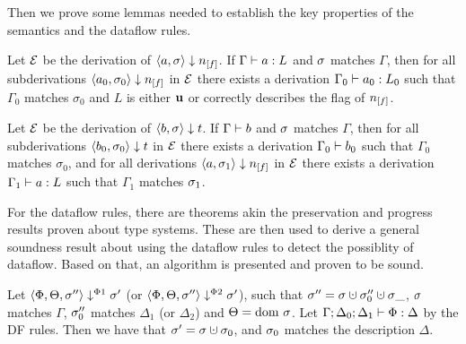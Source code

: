 Then we prove some lemmas needed to establish the key properties of the semantics
and the dataflow rules.
\begin{lemma}
    \label{lem:gamma-arithm}
    Let $\operatorname{\mathcal{E}}$ be the derivation of $\bigstep{a}{\sigma}{\flagged{}}$.
    If $\Gamma \vdash {a}: L$ and $\sigma$ matches $\Gamma$, then 
    for all subderivations $\bigstep{a_0}{\sigma_0}{\flagged{}}$ in $\operatorname{\mathcal{E}}$
    there exists a derivation
    $\Gamma_0 \vdash {a_0}: L_0$ such that $\Gamma_0$ matches $\sigma_0$
    and $L$ is either $\textbf{u}$ or correctly describes the flag of $\flagged{}$.
\end{lemma}
\begin{lemma}
    \label{lem:gamma-bool}
    Let $\operatorname{\mathcal{E}}$ be the derivation of $\langle b, \sigma \rangle \downarrow t$.
    If $\Gamma \vdash {b}$ and $\sigma$ matches $\Gamma$, then 
    for all subderivations $\langle b_0, \sigma_0 \rangle \downarrow t$ in $\operatorname{\mathcal{E}}$
    there exists a derivation
    $\Gamma_0 \vdash {b_0}$ such that $\Gamma_0$ matches $\sigma_0$,
    and for all derivations $\bigstep{a}{\store_1}{\flagged{}}$ in $\operatorname{\mathcal{E}}$
    there exists a derivation $\Gamma_1 \vdash {a}: L$ such that $\Gamma_1$
    matches $\sigma_1$.
\end{lemma}

For the dataflow rules, there are theorems akin the preservation and progress results
proven about type systems.
These are then used to derive a general soundness result about using the dataflow rules
to detect the possiblity of dataflow.
Based on that, an algorithm is presented and proven to be sound.

\begin{lemma}
    \label{thm:preservation-phi}
    Let $\langle \Phi, \Theta, \sigma'' \rangle \downarrow^{\Phi1} \sigma'$ (or $\langle \Phi, \Theta, \sigma'' \rangle \downarrow^{\Phi2} \sigma'$),
    such that $\store'' = \store \dunion \store_0''\dunion \store{\_}$, $\sigma$ matches $\Gamma$, 
    $\sigma_0''$ matches $\Delta_1$ (or $\Delta_2$) and $\Theta = \text{dom }{\sigma}$.
    Let $\Gamma;\Delta_0;\Delta_1 \vdash {\Phi}: \Delta$ by the DF rules.
    Then we have that $\store' = \store \dunion \store_0$,
    and $\sigma_0$ matches the description $\Delta$.
\end{lemma}

